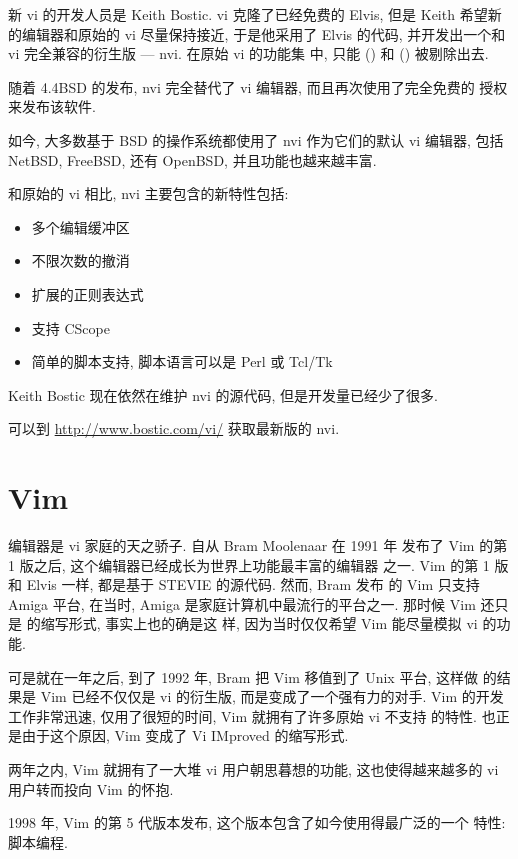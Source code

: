新 vi 的开发人员是 Keith Bostic. vi 克隆了已经免费的 Elvis, 但是 
Keith 希望新的编辑器和原始的 vi 尽量保持接近, 于是他采用了 Elvis 的代码,
并开发出一个和 vi 完全兼容的衍生版 --- nvi. 在原始  vi 的功能集
中, 只能  () 和 
() 被剔除出去.

随着 4.4BSD 的发布, nvi 完全替代了 vi 编辑器, 而且再次使用了完全免费的
授权来发布该软件.

如今, 大多数基于 BSD 的操作系统都使用了 nvi 作为它们的默认 vi 编辑器,
包括 NetBSD, FreeBSD, 还有 OpenBSD, 并且功能也越来越丰富.

和原始的 vi 相比, nvi 主要包含的新特性包括:
\begin{itemize}
    \item 多个编辑缓冲区
    \item 不限次数的撤消
    \item 扩展的正则表达式
    \item 支持 CScope
    \item 简单的脚本支持, 脚本语言可以是 Perl 或 Tcl/Tk
\end{itemize}

Keith Bostic 现在依然在维护 nvi 的源代码, 但是开发量已经少了很多.
\begin{warning}
    可以到 \url{http://www.bostic.com/vi/} 获取最新版的 nvi.
\end{warning}

\section{Vim}
\label{sec:vim}
 编辑器是 vi 家庭的天之骄子. 自从 Bram Moolenaar 在 1991 年
发布了 Vim 的第 1 版之后, 这个编辑器已经成长为世界上功能最丰富的编辑器
之一.
Vim 的第 1 版和 Elvis 一样, 都是基于 STEVIE 的源代码. 然而, Bram 发布 
的 Vim 只支持 Amiga 平台, 在当时, Amiga 是家庭计算机中最流行的平台之一.
那时候 Vim 还只是  的缩写形式, 事实上也的确是这
样, 因为当时仅仅希望 Vim 能尽量模拟 vi 的功能.

可是就在一年之后, 到了 1992 年, Bram 把 Vim 移值到了 Unix 平台, 这样做
的结果是 Vim 已经不仅仅是 vi 的衍生版, 而是变成了一个强有力的对手. Vim 
的开发工作非常迅速, 仅用了很短的时间, Vim 就拥有了许多原始 vi 不支持
的特性. 也正是由于这个原因, Vim 变成了 Vi IMproved 的缩写形式.

两年之内, Vim 就拥有了一大堆 vi 用户朝思暮想的功能, 这也使得越来越多的
vi 用户转而投向 Vim 的怀抱.

1998 年, Vim 的第 5 代版本发布, 这个版本包含了如今使用得最广泛的一个
特性: 脚本编程.

